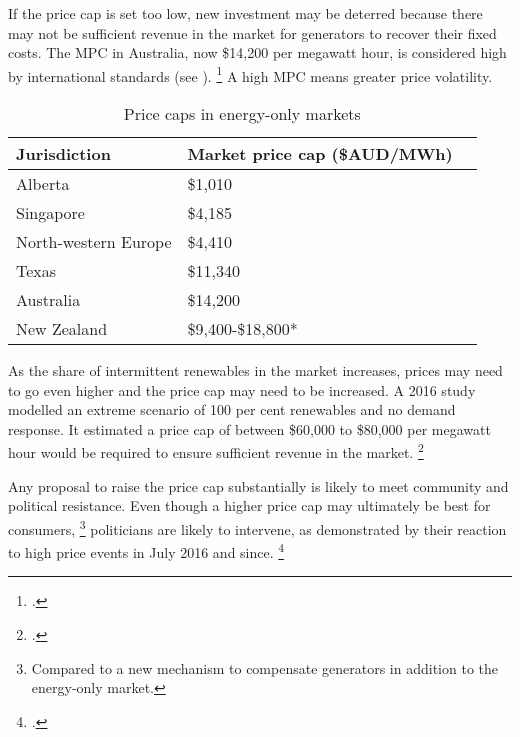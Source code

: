 \documentclass[FrontPage]{grattan}
\begin{document}
If the price cap is set too low, new investment may be deterred because there may not be sufficient revenue in the market for generators to recover their fixed costs. The MPC in Australia, now \$14,200 per megawatt hour, is considered high by international standards (see ).%
\footcite{CIGRE2016CapacityMechanisms}
A high MPC means greater price volatility.

\begin{table}
\caption{Price caps in energy-only markets}\label{tbl:price-caps-in-energy-only-markets}
\begin{tabularx}{\linewidth}{XXR}
%
\toprule
\textbf{Jurisdiction}                           & \textbf{Market price cap (\$AUD/MWh)} \\
\midrule
Alberta & \$1,010\\
Singapore & \$4,185\\
North-western Europe & \$4,410\\
Texas & \$11,340\\
Australia & \$14,200\\
New Zealand & \$9,400-\$18,800*\\
\bottomrule
\end{tabularx}
\end{table}

As the share of intermittent renewables in the market increases, prices may need to go even higher and the price cap may need to be increased.
A 2016 study modelled an extreme scenario of 100 per cent renewables and no demand response. It estimated a price cap of between \$60,000 to \$80,000 per megawatt hour would be required to ensure sufficient revenue in the market.%
\footcite{Riesz2016MPCwithRenewables}

Any proposal to raise the price cap substantially is likely to meet community and political resistance. Even though a higher price cap may ultimately be best for consumers,%
\footnote{Compared to a new mechanism to compensate generators in addition to the energy-only market.}
politicians are likely to intervene, as demonstrated by their reaction to high price events in July 2016 and since.%
\footcites{WoodBlowers-2017-Powering-Through}{WoodBlowers-2016-Keeping-the-lights-on-SA}
\end{document}
